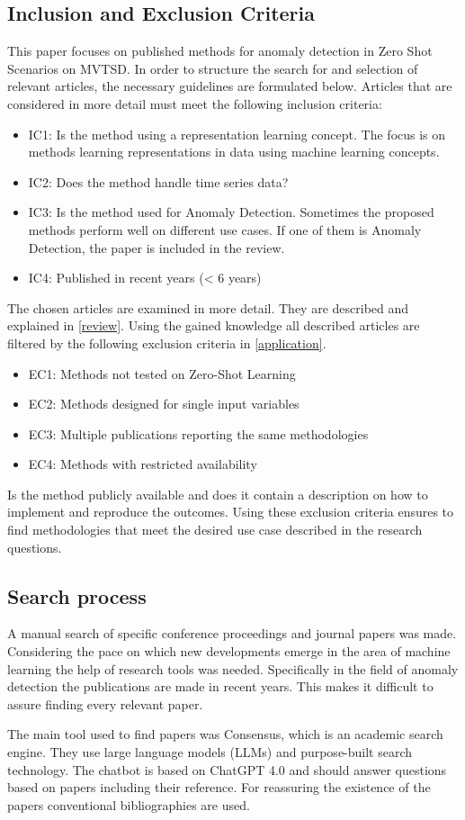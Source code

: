 \subsection{Inclusion and Exclusion Criteria}\label{criteria}
This paper focuses on published methods for anomaly detection in Zero Shot Scenarios on MVTSD. In order to structure the search for and selection of relevant articles, the necessary guidelines are formulated below. Articles that are considered in more detail must meet the following inclusion criteria:
\begin{itemize}
\item IC1: Is the method using a representation learning concept. The focus is on methods learning representations in data using machine learning concepts.
\item IC2: Does the method handle time series data?
\item IC3: Is the method used for Anomaly Detection. Sometimes the proposed methods perform well on different use cases. If one of them is Anomaly Detection, the paper is included in the review.
\item IC4: Published in recent years (< 6 years)
\end{itemize}
The chosen articles are examined in more detail. They are described and explained in \ref{review}. Using the gained knowledge all described articles are filtered by the following exclusion criteria in \ref{application}.
\begin{itemize}
\item EC1: Methods not tested on Zero-Shot Learning
\item EC2: Methods designed for single input variables
\item EC3: Multiple publications reporting the same methodologies
\item EC4: Methods with restricted availability
\end{itemize}
Is the method publicly available and does it contain a description on how to implement and reproduce the outcomes.
Using these exclusion criteria ensures to find methodologies that meet the desired use case described in the research questions.
\subsection{Search process}
A manual search of specific conference proceedings and journal papers was made. Considering the pace on which new developments emerge in the area of machine learning the help of research tools was needed. Specifically in the field of anomaly detection the publications are made in recent years. This makes it difficult to assure finding every relevant paper.

The main tool used to find papers was Consensus, which is an academic search engine. They use large language models (LLMs) and purpose-built search technology. The chatbot is based on ChatGPT 4.0 and should answer questions based on papers including their reference. For reassuring the existence of the papers conventional bibliographies are used.